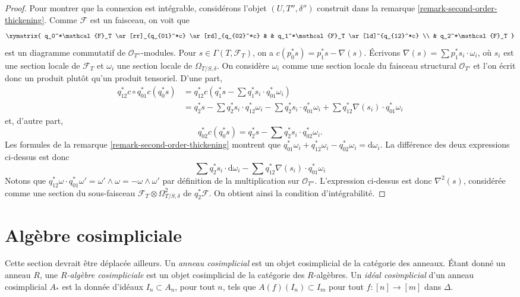 \begin{proof}
\medskip\noindent
Pour montrer que la connexion est intégrable, considérons
l'objet $(U, T'', \delta'')$ construit dans la
remarque \ref{remark-second-order-thickening}.
Comme $\mathcal{F}$ est un faisceau, on voit que
$$
\xymatrix{
q_0^*\mathcal{F}_T \ar[rr]_{q_{01}^*c} \ar[rd]_{q_{02}^*c} & &
q_1^*\mathcal{F}_T \ar[ld]^{q_{12}^*c} \\
& q_2^*\mathcal{F}_T
}
$$
est un diagramme commutatif de $\mathcal{O}_{T''}$-modules. Pour
$s \in \Gamma(T, \mathcal{F}_T)$, on a
$c(p_0^*s) = p_1^*s - \nabla(s)$. Écrivons
$\nabla(s) = \sum p_1^*s_i \cdot \omega_i$, où $s_i$ est une section locale
de $\mathcal{F}_T$ et $\omega_i$ une section locale de $\Omega_{T/S, \delta}$.
On considère $\omega_i$ comme une section locale du faisceau structural
$\mathcal{O}_{T'}$ et l'on écrit donc un produit plutôt qu'un produit
tensoriel. D'une part,
\begin{align*}
q_{12}^*c \circ q_{01}^*c(q_0^*s) & = 
q_{12}^*c(q_1^*s - \sum q_1^*s_i \cdot q_{01}^*\omega_i) \\
& =
q_2^*s - \sum q_2^*s_i \cdot q_{12}^*\omega_i -
\sum q_2^*s_i \cdot q_{01}^*\omega_i +
\sum q_{12}^*\nabla(s_i) \cdot q_{01}^*\omega_i
\end{align*}
et, d'autre part,
$$
q_{02}^*c(q_0^*s) = q_2^*s - \sum q_2^*s_i \cdot q_{02}^*\omega_i.
$$
Les formules de la remarque \ref{remark-second-order-thickening} montrent
que
$q_{01}^*\omega_i + q_{12}^*\omega_i - q_{02}^*\omega_i = \text{d}\omega_i$.
La différence des deux expressions ci-dessus est donc
$$
\sum q_2^*s_i \cdot \text{d}\omega_i -
\sum q_{12}^*\nabla(s_i) \cdot q_{01}^*\omega_i
$$
Notons que
$q_{12}^*\omega \cdot q_{01}^*\omega' = \omega' \wedge \omega =
- \omega \wedge \omega'$ par définition de la multiplication sur
$\mathcal{O}_{T''}$. L'expression ci-dessus est donc $\nabla^2(s)$, considérée
comme une section du sous-faisceau $\mathcal{F}_T \otimes \Omega^2_{T/S, \delta}$ de
$q_2^*\mathcal{F}$. On obtient ainsi la condition d'intégrabilité.
\end{proof}




\section{Algèbre cosimpliciale}
\label{section-cosimplicial}

\noindent
Cette section devrait être déplacée ailleurs. Un
{\it anneau cosimplicial} est un objet cosimplicial
de la catégorie des anneaux. Étant donné un anneau $R$, une
{\it $R$-algèbre cosimpliciale} est un objet cosimplicial de la
catégorie des $R$-algèbres. Un {\it idéal cosimplicial} d'un anneau
cosimplicial $A_*$ est la donnée d'idéaux $I_n \subset A_n$, pour tout $n$, tels
que $A(f)(I_n) \subset I_m$ pour tout $f : [n] \to [m]$ dans $\Delta$.

